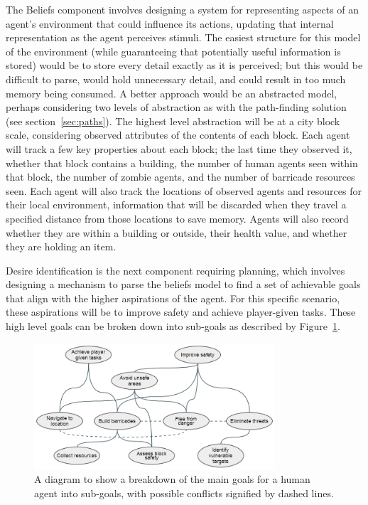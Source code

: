 \documentclass[12pt,a4paper]{article}
\begin{document}
The Beliefs component involves designing a system for representing aspects of an agent's environment that could influence its actions, updating that internal representation as the agent perceives stimuli. The easiest structure for this model of the environment (while guaranteeing that potentially useful information is stored) would be to store every detail exactly as it is perceived; but this would be difficult to parse, would hold unnecessary detail, and could result in too much memory being consumed. A better approach would be an abstracted model, perhaps considering two levels of abstraction as with the path-finding solution (see section~\ref{sec:paths}). The highest level abstraction will be at a city block scale, considering observed attributes of the contents of each block. Each agent will track a few key properties about each block; the last time they observed it, whether that block contains a building, the number of human agents seen within that block, the number of zombie agents, and the number of barricade resources seen. Each agent will also track the locations of observed agents and resources for their local environment, information that will be discarded when they travel a specified distance from those locations to save memory. Agents will also record whether they are within a building or outside, their health value, and whether they are holding an item.

Desire identification is the next component requiring planning, which involves designing a mechanism to parse the beliefs model to find a set of achievable goals that align with the higher aspirations of the agent. For this specific scenario, these aspirations will be to improve safety and achieve player-given tasks. These high level goals can be broken down into sub-goals as described by Figure~\ref{fig:goals}.

\begin{figure}[h]
\centering
\includegraphics[width=0.8\textwidth]{goals}
\caption{A diagram to show a breakdown of the main goals for a human agent into sub-goals, with possible conflicts signified by dashed lines.}
\label{fig:goals}
\end{figure}
\end{document}

